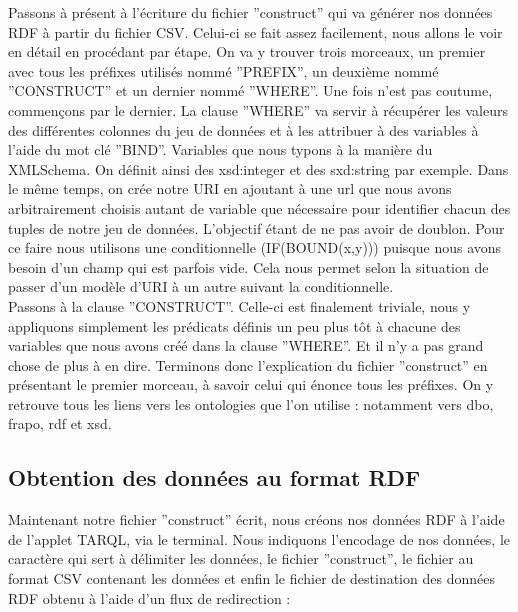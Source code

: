 \documentclass[a4paper,sffamily,12pt]{article}
\begin{document}
			Passons à présent à l'écriture du fichier ''construct'' qui va générer nos données RDF à partir du fichier CSV. Celui-ci se fait assez facilement, nous allons le voir en détail en procédant par étape. On va y trouver trois morceaux, un premier avec tous les préfixes utilisés nommé ''PREFIX'', un deuxième nommé ''CONSTRUCT'' et un dernier nommé ''WHERE''. Une fois n'est pas coutume, commençons par le dernier. La clause ''WHERE'' va servir à récupérer les valeurs des différentes colonnes du jeu de données et à les attribuer à des variables à l'aide du mot clé ''BIND''. Variables que nous typons à la manière du XMLSchema. On définit ainsi des xsd:integer et des sxd:string par exemple. Dans le même temps, on crée notre URI en ajoutant à une url que nous avons arbitrairement choisis autant de variable que nécessaire pour identifier chacun des tuples de notre jeu de données. L'objectif étant de ne pas avoir de doublon. Pour ce faire nous utilisons une conditionnelle (IF(BOUND(x,y))) puisque nous avons besoin d'un champ qui est parfois vide. Cela nous permet selon la situation de passer d'un modèle d'URI à un autre suivant la conditionnelle. \\
			
			\indent Passons à la clause ''CONSTRUCT''. Celle-ci est finalement triviale,  nous y appliquons simplement les prédicats définis un peu plus tôt à chacune des variables que nous avons créé dans la clause ''WHERE''.  Et il n'y a pas grand chose de plus à en dire. Terminons donc l'explication du fichier ''construct'' en présentant le premier morceau, à savoir celui qui énonce tous les préfixes. On y retrouve tous les liens vers les ontologies que l'on utilise : notamment vers dbo, frapo, rdf et xsd. \\
			
			\vspace{0.5cm}
			
		\subsection{Obtention des données au format RDF}
			
			\vspace{0.5cm}
	
			Maintenant notre fichier ''construct'' écrit, nous créons nos données RDF à l'aide de l'applet TARQL, via le terminal. Nous indiquons l'encodage de nos données, le caractère qui sert à délimiter les données, le fichier ''construct'', le fichier au format CSV contenant les données et enfin le fichier de destination des données RDF obtenu à l'aide d'un flux de redirection : \\
			
\end{document}
